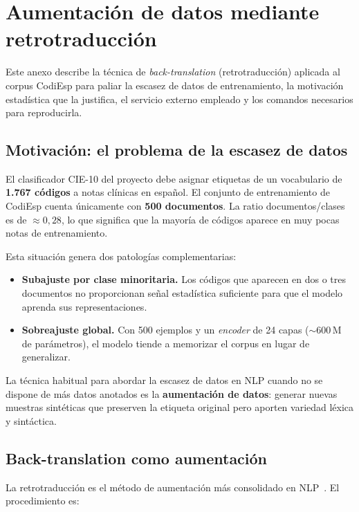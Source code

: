 \chapter{Aumentación de datos mediante retrotraducción}
\label{cap:AnexoL}

Este anexo describe la técnica de \emph{back-translation} (retrotraducción) aplicada al corpus CodiEsp para paliar la escasez de datos de entrenamiento, la motivación estadística que la justifica, el servicio externo empleado y los comandos necesarios para reproducirla.

\section{Motivación: el problema de la escasez de datos}

El clasificador CIE-10 del proyecto debe asignar etiquetas de un vocabulario de \textbf{1.767 códigos} a notas clínicas en español. El conjunto de entrenamiento de CodiEsp cuenta únicamente con \textbf{500 documentos}. La ratio documentos/clases es de $\approx 0{,}28$, lo que significa que la mayoría de códigos aparece en muy pocas notas de entrenamiento.

Esta situación genera dos patologías complementarias:

\begin{itemize}
  \item \textbf{Subajuste por clase minoritaria.} Los códigos que aparecen en dos o tres documentos no proporcionan señal estadística suficiente para que el modelo aprenda sus representaciones.
  \item \textbf{Sobreajuste global.} Con 500 ejemplos y un \emph{encoder} de 24 capas ($\sim$600\,M de parámetros), el modelo tiende a memorizar el corpus en lugar de generalizar.
\end{itemize}

La técnica habitual para abordar la escasez de datos en NLP cuando no se dispone de más datos anotados es la \textbf{aumentación de datos}: generar nuevas muestras sintéticas que preserven la etiqueta original pero aporten variedad léxica y sintáctica.

\section{Back-translation como aumentación}

La retrotraducción es el método de aumentación más consolidado en NLP~\cite{sennrich2016improving}. El procedimiento es:

